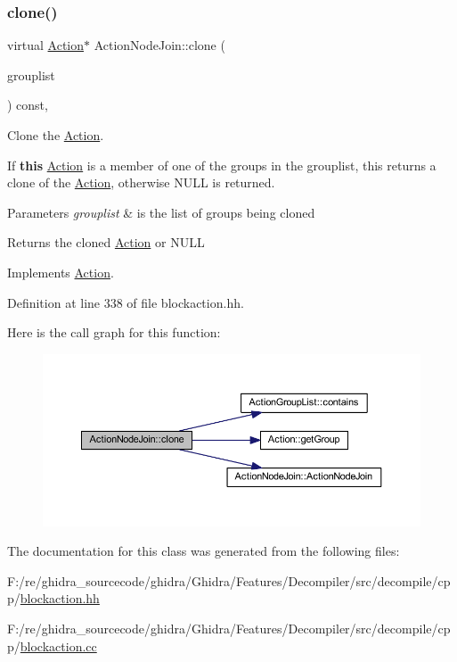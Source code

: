 \subsubsection{\texorpdfstring{clone()}{clone()}}
{\footnotesize\ttfamily virtual \mbox{\hyperlink{class_action}{Action}}$\ast$ Action\+Node\+Join\+::clone (\begin{DoxyParamCaption}\item[{const \mbox{\hyperlink{class_action_group_list}{Action\+Group\+List}} \&}]{grouplist }\end{DoxyParamCaption}) const\hspace{0.3cm}{\ttfamily [inline]}, {\ttfamily [virtual]}}



Clone the \mbox{\hyperlink{class_action}{Action}}. 

If {\bfseries{this}} \mbox{\hyperlink{class_action}{Action}} is a member of one of the groups in the grouplist, this returns a clone of the \mbox{\hyperlink{class_action}{Action}}, otherwise N\+U\+LL is returned. 
\begin{DoxyParams}{Parameters}
{\em grouplist} & is the list of groups being cloned \\
\hline
\end{DoxyParams}
\begin{DoxyReturn}{Returns}
the cloned \mbox{\hyperlink{class_action}{Action}} or N\+U\+LL 
\end{DoxyReturn}


Implements \mbox{\hyperlink{class_action_af8242e41d09e5df52f97df9e65cc626f}{Action}}.



Definition at line 338 of file blockaction.\+hh.

Here is the call graph for this function\+:
\nopagebreak
\begin{figure}[H]
\begin{center}
\leavevmode
\includegraphics[width=350pt]{class_action_node_join_a51276a131d48cca6feead5edad6cc3d4_cgraph}
\end{center}
\end{figure}


The documentation for this class was generated from the following files\+:\begin{DoxyCompactItemize}
\item 
F\+:/re/ghidra\+\_\+sourcecode/ghidra/\+Ghidra/\+Features/\+Decompiler/src/decompile/cpp/\mbox{\hyperlink{blockaction_8hh}{blockaction.\+hh}}\item 
F\+:/re/ghidra\+\_\+sourcecode/ghidra/\+Ghidra/\+Features/\+Decompiler/src/decompile/cpp/\mbox{\hyperlink{blockaction_8cc}{blockaction.\+cc}}\end{DoxyCompactItemize}
